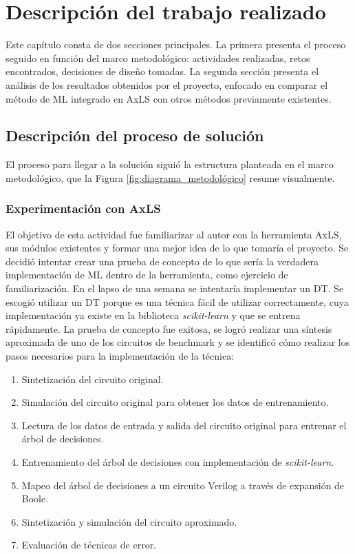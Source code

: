 \chapter{Descripción del trabajo realizado}

Este capítulo consta de dos secciones principales. La primera presenta el
proceso seguido en función del marco metodológico: actividades realizadas,
retos encontrados, decisiones de diseño tomadas. La segunda sección presenta el
análisis de los resultados obtenidos por el proyecto, enfocado en comparar el
método de ML integrado en AxLS con otros métodos previamente existentes.

\section{Descripción del proceso de solución}

El proceso para llegar a la solución siguió la estructura planteada en el marco
metodológico, que la Figura \ref{fig:diagrama_metodológico} resume visualmente.

\subsection{Experimentación con AxLS}

El objetivo de esta actividad fue familiarizar al autor con la herramienta
AxLS, sus módulos existentes y formar una mejor idea de lo que tomaría el
proyecto. Se decidió intentar crear una prueba de concepto de lo que sería la
verdadera implementación de ML dentro de la herramienta, como ejercicio de
familiarización.
En el lapso de una semana se intentaría implementar un DT. Se
escogió utilizar un DT porque es una técnica fácil de utilizar correctamente,
cuya implementación ya existe en la biblioteca \emph{scikit-learn} y que se
entrena rápidamente.
La prueba de concepto fue exitosa, se logró realizar una síntesis aproximada de
uno de los circuitos de benchmark y se identificó cómo realizar los pasos
necesarios para la implementación de la técnica:

\begin{enumerate}
  \item Sintetización del circuito original.
  \item Simulación del circuito original para obtener los datos de entrenamiento.
  \item Lectura de los datos de entrada y salida del circuito original para
    entrenar el árbol de decisiones.
  \item Entrenamiento del árbol de decisiones con implementación de
    \emph{scikit-learn}.
  \item Mapeo del árbol de decisiones a un circuito Verilog a través de
    expansión de Boole.
  \item Sintetización y simulación del circuito aproximado.
  \item Evaluación de técnicas de error.
\end{enumerate}

